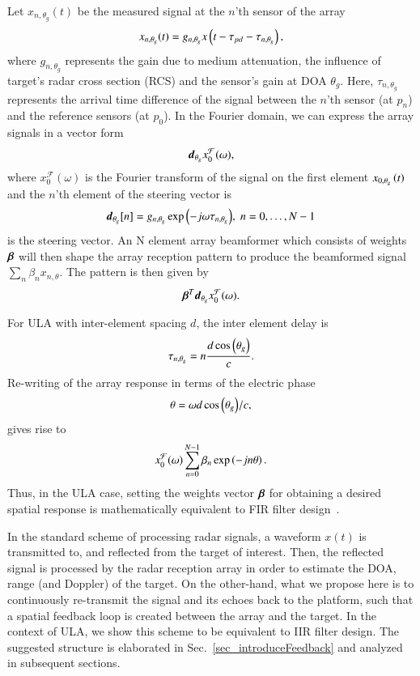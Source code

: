 Let $x_{n,\theta_g}(t)$ be the measured signal at the $n$'th sensor of the array
\begin{equation}
x_{n,\theta_g}(t) = g_{n,\theta_{g}}x\Brack{t-\tau_{pd}-\tau_{n,\theta_{g}}},
\label{eqn:noFeedbackULA_singleSensor_temporal}
\end{equation}
where $g_{n,\theta_{g}}$ represents the gain due to medium attenuation, the influence of target's radar cross section (RCS) and the sensor's gain at DOA $\theta_g$. Here, $\tau_{n,\theta_{g}}$ represents the arrival time difference of the signal between the $n$'th sensor (at $p_n$) and the reference sensors (at $p_{0}$). In the Fourier domain, we can express the array signals in a vector form 
\[
\boldsymbol{d}_{\theta_g}x^\mathcal{F}_0(\omega),
\]
where $x^\mathcal{F}_0(\omega)$ is the Fourier transform of the signal on the first element $x_{0,\theta_g}\left({t}\right)$ and the $n$'th element of the steering vector is
\begin{equation}
    \label{eq:d}
    \vd_{\theta_g}[n] = g_{n,\theta_{g}}\exp{\rBrace{-j\omega\tau_{n,\theta_g}}},\;n=0,\ldots,N-1 
\end{equation}
is the steering vector. An N element array beamformer which consists of weights $\boldsymbol{\beta}$ will then shape the array reception pattern to produce the beamformed signal $\sum_n \beta_n x_{n,\theta}$. The pattern is then given by 
$$ \boldsymbol{\beta}^{T}\boldsymbol{d}_{\theta_g}x^\mathcal{F}_0(\omega). $$ 
\par For ULA with inter-element spacing $d$, the inter element delay is
$$
\tau_{n,\theta_g}=n\frac{d\cos\left({\theta_{g}}\right)}{c}.
$$
Re-writing of the array response in terms of the electric phase
\begin{equation}\label{eq:thetaULA}
\theta=\omega{d\cos\Brack{\theta_{g}}}/{c},
\end{equation}
gives rise to
\[
x^\mathcal{F}_0(\omega)\sum_{n=0}^{N-1}\beta_n
\exp\left({-jn\theta}\right).
\]
Thus, in the ULA case, setting the weights vector $\boldsymbol{\beta}$ for obtaining a desired spatial response is mathematically equivalent to FIR filter design~\cite{VanVeenBeamforming:Filtering}.
\par In the standard scheme of processing radar signals, a waveform $x(t)$ is transmitted to, and reflected from the target of interest. Then, the reflected signal is processed by the radar reception array in order to estimate the DOA, range (and Doppler) of the target. On the other-hand, what we propose here is to continuously re-transmit the signal and its echoes back to the platform, such that a spatial feedback loop is created between the array and the target. In the context of ULA, we show this scheme to be equivalent to IIR filter design. The suggested structure is elaborated in Sec.~\ref{sec_introduceFeedback} and analyzed in subsequent sections.
